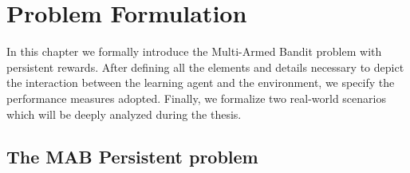 \chapter{Problem Formulation}\label{CF}



In this chapter we formally introduce the Multi-Armed Bandit problem with persistent rewards. After defining all the elements and details necessary to depict the interaction between the learning agent and the environment, we specify the performance measures adopted. Finally, we formalize two real-world scenarios which will be deeply analyzed during the thesis.


\section{The MAB Persistent problem}

